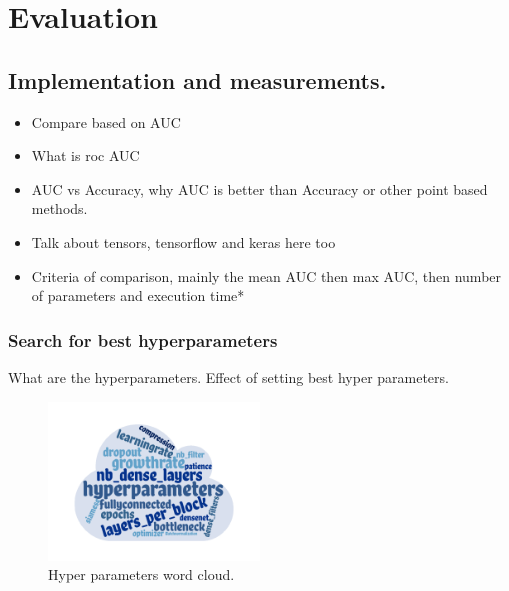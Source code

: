 
\chapter{Evaluation}
\label{chap:evaluation}

\section{Implementation and measurements.}

\begin{itemize}
 \item Compare based on AUC
 \item What is roc AUC
 \item AUC vs Accuracy, why AUC is better than Accuracy or other point based methods.
 \item Talk about tensors, tensorflow and keras here too
 \item Criteria of comparison, mainly the mean AUC then max AUC, then number of parameters and execution time*
\end{itemize}


\subsection{Search for best hyperparameters}
What are the hyperparameters.
Effect of setting best hyper parameters.

\begin{figure}[ht]
\centering
\includegraphics[width=0.5\textwidth]{images/densenet/wordcloud_hyperparameters.png}
\caption{\label{fig:wordcloud_hp}Hyper parameters word cloud.}
\end{figure}

